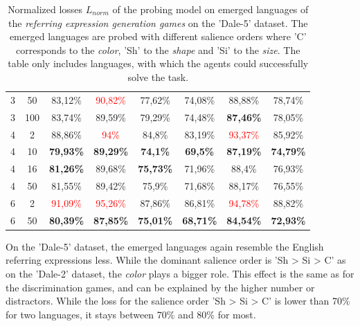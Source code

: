 \begin{table}[ht]
\begin{tabular}{cc|c|c|c|c|c|c}
        {3} & {50}  & {83,12\%}                & \textcolor{red}{90,82\%} & {77,62\%}                & {74,08\%}            & {88,88\%}                & {78,74\%}                \\
        {3} & {100} & {83,74\%}                & {89,59\%}                & {79,29\%}                & {74,48\%}            & \textbf{87,46\%}         & {78,05\%}                \\
        {4} & {2}   & {88,86\%}                & \textcolor{red}{94\%}    & {84,8\%}                 & {83,19\%}            & \textcolor{red}{93,37\%} & {85,92\%}                \\
        {4} & {10}  & \textbf{79,93\%}         & \textbf{89,29\%}         & \textbf{74,1\%}          & \textbf{69,5\%}      & \textbf{87,19\%}         & \textbf{74,79\%}         \\
        {4} & {16}  & \textbf{81,26\%}         & {89,68\%}                & \textbf{75,73\%}         & {71,96\%}            & {88,4\%}                 & {76,93\%}                \\
        {4} & {50}  & {81,55\%}                & {89,42\%}                & {75,9\%}                 & {71,68\%}            & {88,17\%}                & {76,55\%}                \\
        {6} & {2}   & \textcolor{red}{91,09\%} & \textcolor{red}{95,26\%} & {87,86\%}                & {86,81\%}            & \textcolor{red}{94,78\%} & {88,82\%}                \\
        {6} & {50}  & \textbf{80,39\%}         & \textbf{87,85\%}         & \textbf{75,01\%}         & \textbf{68,71\%}     & \textbf{84,54\%}         & \textbf{72,93\%}         \\
        \bottomrule
    \end{tabular}
    \caption{Normalized losses $L_{norm}$ of the probing model on emerged languages of the \emph{referring expression generation games} on the 'Dale-5' dataset. The emerged languages are probed with different salience orders where 'C' corresponds to the \emph{color}, 'Sh' to the \emph{shape} and 'Si' to the \emph{size}. The table only includes languages, with which the agents could successfully solve the task.}
    \label{tab:probing:re-generator:dale-5}
\end{table}

On the 'Dale-5' dataset, the emerged languages again resemble the English referring expressions less.
While the dominant salience order is 'Sh > Si > C' as on the 'Dale-2' dataset, the \emph{color} plays a bigger role.
This effect is the same as for the discrimination games, and can be explained by the higher number or distractors.
While the loss for the salience order 'Sh > Si > C' is lower than 70\% for two languages, it stays between 70\% and 80\% for most.


